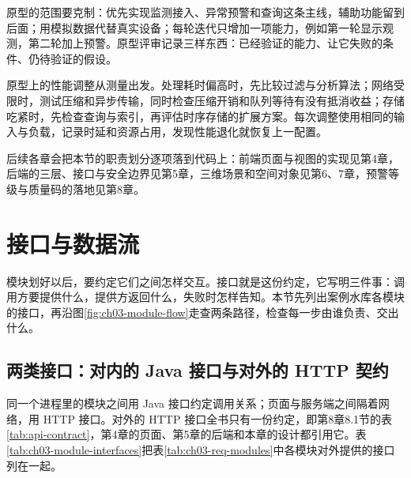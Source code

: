 原型的范围要克制：优先实现监测接入、异常预警和查询这条主线，辅助功能留到后面；用模拟数据代替真实设备；每轮迭代只增加一项能力，例如第一轮显示观测，第二轮加上预警。原型评审记录三样东西：已经验证的能力、让它失败的条件、仍待验证的假设。

原型上的性能调整从测量出发。处理耗时偏高时，先比较过滤与分析算法；网络受限时，测试压缩和异步传输，同时检查压缩开销和队列等待有没有抵消收益；存储吃紧时，先检查查询与索引，再评估时序存储的扩展方案。每次调整使用相同的输入与负载，记录时延和资源占用，发现性能退化就恢复上一配置。

后续各章会把本节的职责划分逐项落到代码上：前端页面与视图的实现见第4章，后端的三层、接口与安全边界见第5章，三维场景和空间对象见第6、7章，预警等级与质量码的落地见第8章。

\section{接口与数据流}\label{sec:ch03-interfaces}


模块划好以后，要约定它们之间怎样交互。接口就是这份约定，它写明三件事：调用方要提供什么，提供方返回什么，失败时怎样告知。本节先列出案例水库各模块的接口，再沿图\ref{fig:ch03-module-flow}走查两条路径，检查每一步由谁负责、交出什么。

\subsection{两类接口：对内的 Java 接口与对外的 HTTP 契约}

同一个进程里的模块之间用 Java 接口约定调用关系；页面与服务端之间隔着网络，用 HTTP 接口。对外的 HTTP 接口全书只有一份约定，即第8章8.1节的表\ref{tab:api-contract}，第4章的页面、第5章的后端和本章的设计都引用它。表\ref{tab:ch03-module-interfaces}把表\ref{tab:ch03-req-modules}中各模块对外提供的接口列在一起。

